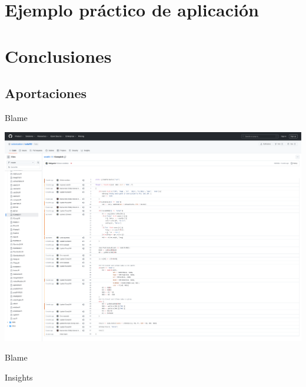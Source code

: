 \documentclass[aspectratio=169, usenames,svgnames,dvipsnames]{beamer}
\begin{document}
\section{Ejemplo práctico de aplicación}
\label{sec:org39486c1}

\section{Conclusiones}
\label{sec:org629c7b3}
\subsection{Aportaciones}
\label{sec:org0b26002}
\begin{frame}[label={sec:org43df7eb}]{Blame}
\begin{center}
\includegraphics[height=0.9\textheight]{../figuras/blame-fCompD.pdf}
\end{center}
\end{frame}
\begin{frame}[label={sec:org4bf6ea8}]{Blame}
\end{frame}
\begin{frame}[label={sec:org5a2a9c6}]{Insights}
\end{frame}
\end{document}
